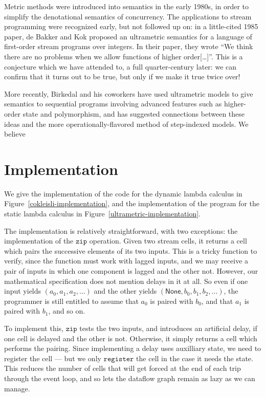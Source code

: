 \documentclass[preprint]{sigplanconf}
\newcommand{\term}[1]{\ensuremath{\mathtt{{#1}}}}
\newcommand{\None}{\mathsf{None}}
\begin{document}
Metric methods were introduced into semantics in the early 1980s, in
order to simplify the denotational semantics of concurrency. The
applications to stream programming were recognized early, but not
followed up on: in a little-cited 1985 paper, de Bakker and Kok
proposed an ultrametric semantics for a language of first-order stream
programs over integers. In their paper, they wrote ``We think there
are no problems when we allow functions of higher order[\ldots]''.
This is a conjecture which we have attended to, a full quarter-century
later: we can confirm that it turns out to be true, but only if we
make it true twice over!

More recently, Birkedal and his coworkers have used ultrametric models
to give semantics to sequential programs involving advanced features
such as higher-order state and polymorphism, and has suggested
connections between these ideas and the more operationally-flavored
method of step-indexed models. We believe 

\appendix

\section{Implementation}

We give the implementation of the code for the dynamic lambda calculus
in Figure~\ref{cokleisli-implementation}, and the implementation of the
program for the static lambda calculus in Figure~\ref{ultrametric-implementation}. 

The implementation is relatively straightforward, with two exceptions:
the implementation of the \term{zip} operation. Given two stream
cells, it returns a cell which pairs the successive elements of its
two inputs. This is a tricky function to verify, since the function
must work with lagged inputs, and we may receive a pair of inputs in
which one component is lagged and the other not. However, our
mathematical specification does not mention delays in it at all. So
even if one input yields $(a_0, a_1, a_2, \ldots)$ and the other
yields $(\None, b_0, b_1, b_2, \ldots)$, the programmer is still
entitled to assume that $a_0$ is paired with $b_0$, and that $a_1$ is
paired with $b_1$, and so on.

To implement this, \term{zip} tests the two inputs, and introduces an
artificial delay, if one cell is delayed and the other is not.
Otherwise, it simply returns a cell which performs the pairing. Since
implementing a delay uses auxilliary state, we need to register the
cell --- but we only \term{register} the cell in the case it needs the
state. This reduces the number of cells that will get forced at the
end of each trip through the event loop, and so lets the dataflow
graph remain as lazy as we can manage. 
\end{document}
